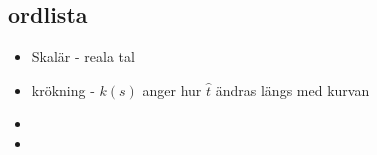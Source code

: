 \documentclass[a4paper,12pt]{article}
\begin{document}
\subsection{ordlista}

\begin{itemize}

  \item Skalär - reala tal

  \item krökning - $k(s)$ anger hur $\hat{t}$ ändras längs med kurvan

  \item 

  \item

\end{itemize}
\end{document}
